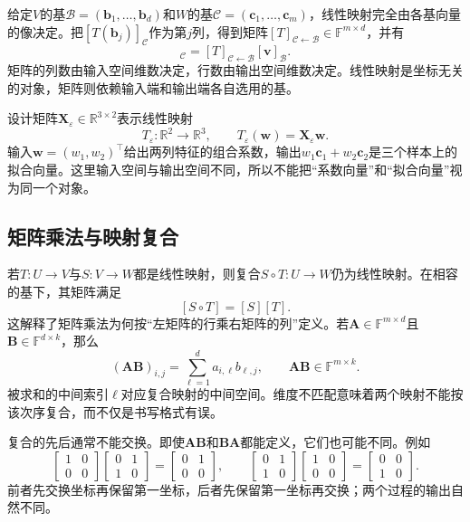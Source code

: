 给定$V$的基$\mathcal{B}=(\bm{b}_1,\ldots,\bm{b}_d)$和$W$的基$\mathcal{C}=(\bm{c}_1,\ldots,\bm{c}_m)$，线性映射完全由各基向量的像决定。把$[T(\bm{b}_j)]_{\mathcal{C}}$作为第$j$列，得到矩阵$[T]_{\mathcal{C}\leftarrow\mathcal{B}}\in\mathbb{F}^{m\times d}$，并有
\begin{equation}
  [T(\bm{v})]_{\mathcal{C}} = [T]_{\mathcal{C}\leftarrow\mathcal{B}} [\bm{v}]_{\mathcal{B}}. \label{eq:linear-algebra-map-matrix-representation}
\end{equation}
矩阵的列数由输入空间维数决定，行数由输出空间维数决定。线性映射是坐标无关的对象，矩阵则依赖输入端和输出端各自选用的基。

设计矩阵$\bm{X}_{\varepsilon}\in\mathbb{R}^{3\times2}$表示线性映射
\[
  T_{\varepsilon}:\mathbb{R}^2\to\mathbb{R}^3,
  \qquad
  T_{\varepsilon}(\bm{w})=\bm{X}_{\varepsilon}\bm{w}.
\]
输入$\bm{w}=(w_1,w_2)^{\top}$给出两列特征的组合系数，输出$w_1\bm{c}_1+w_2\bm{c}_2$是三个样本上的拟合向量。这里输入空间与输出空间不同，所以不能把“系数向量”和“拟合向量”视为同一个对象。

\subsection{矩阵乘法与映射复合}

若$T:U\to V$与$S:V\to W$都是线性映射，则复合$S\circ T:U\to W$仍为线性映射。在相容的基下，其矩阵满足
\[
  [S\circ T]=[S][T].
\]
这解释了矩阵乘法为何按“左矩阵的行乘右矩阵的列”定义。若$\bm{A}\in\mathbb{F}^{m\times d}$且$\bm{B}\in\mathbb{F}^{d\times k}$，那么
\begin{equation}
  (\bm{A}\bm{B})_{i,j} = \sum_{\ell=1}^{d}a_{i,\ell}b_{\ell,j}, \qquad \bm{A}\bm{B}\in\mathbb{F}^{m\times k}. \label{eq:linear-algebra-matrix-product}
\end{equation}
被求和的中间索引$\ell$对应复合映射的中间空间。维度不匹配意味着两个映射不能按该次序复合，而不仅是书写格式有误。

复合的先后通常不能交换。即使$\bm{A}\bm{B}$和$\bm{B}\bm{A}$都能定义，它们也可能不同。例如
\[
  \begin{bmatrix} 1&0\\0&0 \end{bmatrix}
  \begin{bmatrix} 0&1\\1&0 \end{bmatrix}
  =
  \begin{bmatrix} 0&1\\0&0 \end{bmatrix},
  \qquad
  \begin{bmatrix} 0&1\\1&0 \end{bmatrix}
  \begin{bmatrix} 1&0\\0&0 \end{bmatrix}
  =
  \begin{bmatrix} 0&0\\1&0 \end{bmatrix}.
\]
前者先交换坐标再保留第一坐标，后者先保留第一坐标再交换；两个过程的输出自然不同。

